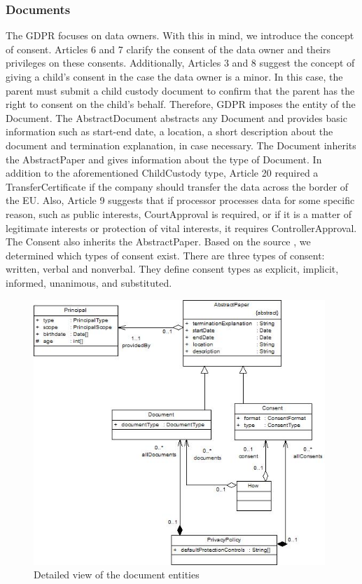 \documentclass[11pt,english]{article}
\begin{document}
\subsubsection{Documents}
The GDPR focuses on data owners. With this in mind, we introduce the concept of consent. Articles 6 and 7 clarify the consent of the data owner and theirs privileges on these consents. Additionally, Articles 3 and 8 suggest the concept of giving a child's consent in the case the data owner is a minor. In this case, the parent must submit a child custody document to confirm that the parent has the right to consent on the child's behalf. Therefore, GDPR imposes the entity of the Document. \newline The AbstractDocument abstracts any Document and provides basic information such as start-end date,  a location, a short description about the document and termination explanation, in case necessary. \newline  The Document inherits the AbstractPaper and gives information about the type of Document. In addition to the aforementioned ChildCustody type, Article 20 required a TransferCertificate if the company should transfer the data across the border of the EU. Also, Article 9 suggests that if processor processes data for some specific reason, such as public interests, CourtApproval is required, or if it is a matter of legitimate interests or protection of vital interests, it requires ControllerApproval. \newline The Consent also inherits the AbstractPaper. Based on the source \cite{consent}, we determined which types of consent exist. There are three types of consent: written, verbal and nonverbal. They define consent types as explicit, implicit, informed, unanimous, and substituted.
\begin{figure}[H]
    \centering
    \includegraphics[width=11cm]{images/document.jpg}
    \caption{Detailed view of the document entities}
    \label{fig:Document}
\end{figure}
\end{document}
